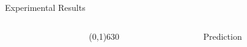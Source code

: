 \documentclass[final]{beamer}
\newcommand{\heading}[1]{\alert{\large #1}\\}
\begin{document}
\begin{frame}{}
\begin{block}{Experimental Results}
\begin{columns}[T]
\begin{column}{0.4\textwidth}
\begin{minipage}{0.33\textwidth}
	
	  \end{minipage}
	  
	  
	  
	\vspace*{12pt}
    \end{column}
   \begin{column}{0.005\textwidth}\linethickness{0.3ex}
      \color{myPurple} \line(0,1){630}
   \end{column} %
   
    \begin{column}{0.55\textwidth}
    \heading{Prediction}
    

\end{column}
\end{columns}
\end{block}
\end{frame}
\end{document}
